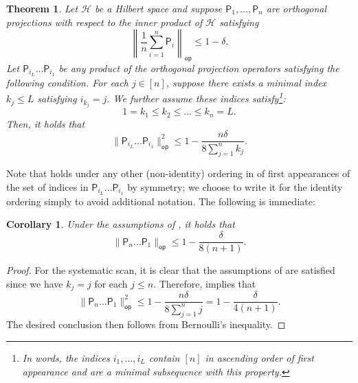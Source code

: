 \documentclass[11pt]{article}
\newtheorem{theorem}{Theorem}[section]
\newtheorem{corollary}{Corollary}[section]
\begin{document}
\begin{theorem}
\label{thm:gen_gap}
        Let $\mathcal{H}$ be a Hilbert space and suppose $\mathsf{P}_1,\ldots, \mathsf{P}_n$ are orthogonal projections with respect to the inner product of $\mathcal{H}$ satisfying
        \begin{equation}
    \left\|\frac{1}{n}\sum_{i=1}^n \mathsf{P}_i\right\|_{\mathsf{op}}\leq 1-\delta.
\end{equation} 
Let $\mathsf{P}_{i_L}\ldots \mathsf{P}_{i_1}$ be any product of the orthogonal projection operators satisfying the following condition. For each $j\in [n]$, suppose there exists a minimal index $k_j\leq L$ satisfying $i_{k_j}=j$. We further assume these indices satisfy\footnote{In words, the indices $i_1,\ldots,i_L$ contain $[n]$ in ascending order of first appearance and are a minimal subsequence with this property.}:
\begin{equation}
\label{eq:order}
        1=k_1\leq k_2\leq\ldots\leq k_n=L.
\end{equation}
Then, it holds that
\begin{equation*}
    \|\mathsf{P}_{i_L}\ldots \mathsf{P}_{i_1}\|_{\mathsf{op}}^2\leq 1-\frac{n\delta}{8\sum_{j=1}^n k_j}.
\end{equation*}
\end{theorem}

Note that  holds under any other (non-identity) ordering in  of first appearances of the set of indices in $\mathsf{P}_{i_L}\ldots \mathsf{P}_{i_1}$ by symmetry; we choose to write it for the identity ordering simply to avoid additional notation. The following is immediate:

\begin{corollary}
\label{cor:spectral_scan}
    Under the assumptions of , it holds that 
    \begin{equation*}
        \|\mathsf{P}_n\ldots \mathsf{P}_1\|_{\mathsf{op}}\leq 1-\frac{\delta}{8(n+1)}.
    \end{equation*}
\end{corollary}
\begin{proof}
    For the systematic scan, it is clear that the assumptions of  are satisfied since we have $k_j=j$ for each $j\leq n$. Therefore,  implies that
    \begin{equation*}
        \|\mathsf{P}_n\ldots \mathsf{P}_1\|_{\mathsf{op}}^2\leq 1-\frac{n\delta}{8\sum_{j=1}^n j}=1-\frac{\delta}{4(n+1)}.
    \end{equation*}
    The desired conclusion then follows from Bernoulli's inequality.
\end{proof}
\end{document}
